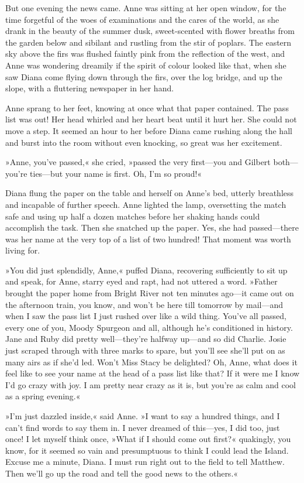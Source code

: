 But one evening the news came. Anne was sitting at her open window, for the time forgetful of the woes of examinations and the cares of the world, as she drank in the beauty of the summer dusk, sweet-scented with flower breaths from the garden below and sibilant and rustling from the stir of poplars. The eastern sky above the firs was flushed faintly pink from the reflection of the west, and Anne was wondering dreamily if the spirit of colour looked like that, when she saw Diana come flying down through the firs, over the log bridge, and up the slope, with a fluttering newspaper in her hand.

Anne sprang to her feet, knowing at once what that paper contained. The pass list was out! Her head whirled and her heart beat until it hurt her. She could not move a step. It seemed an hour to her before Diana came rushing along the hall and burst into the room without even knocking, so great was her excitement.

»Anne, you've passed,« she cried, »passed the very first—you and Gilbert both—you're ties—but your name is first. Oh, I'm so proud!«

Diana flung the paper on the table and herself on Anne's bed, utterly breathless and incapable of further speech. Anne lighted the lamp, oversetting the match safe and using up half a dozen matches before her shaking hands could accomplish the task. Then she snatched up the paper. Yes, she had passed—there was her name at the very top of a list of two hundred! That moment was worth living for.

»You did just splendidly, Anne,« puffed Diana, recovering sufficiently to sit up and speak, for Anne, starry eyed and rapt, had not uttered a word. »Father brought the paper home from Bright River not ten minutes ago—it came out on the afternoon train, you know, and won't be here till tomorrow by mail—and when I saw the pass list I just rushed over like a wild thing. You've all passed, every one of you, Moody Spurgeon and all, although he's conditioned in history. Jane and Ruby did pretty well—they're halfway up—and so did Charlie. Josie just scraped through with three marks to spare, but you'll see she'll put on as many airs as if she'd led. Won't Miss Stacy be delighted? Oh, Anne, what does it feel like to see your name at the head of a pass list like that? If it were me I know I'd go crazy with joy. I am pretty near crazy as it is, but you're as calm and cool as a spring evening.«

»I'm just dazzled inside,« said Anne. »I want to say a hundred things, and I can't find words to say them in. I never dreamed of this—yes, I did too, just once! I let myself think once, »What if I should come out first?« quakingly, you know, for it seemed so vain and presumptuous to think I could lead the Island. Excuse me a minute, Diana. I must run right out to the field to tell Matthew. Then we'll go up the road and tell the good news to the others.«

